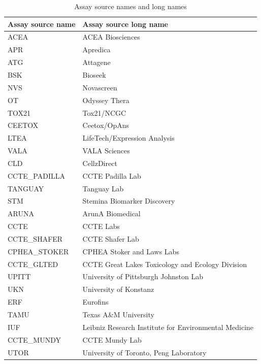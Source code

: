 \begin{table}[h]
    \centering
    \caption{Assay source names and long names}
    \small %
    \begin{tabular}{ll}
        \toprule
        Assay source name & Assay source long name \\
        \midrule
        ACEA & ACEA Biosciences \\
        APR & Apredica \\
        ATG & Attagene \\
        BSK & Bioseek \\
        NVS & Novascreen \\
        OT & Odyssey Thera \\
        TOX21 & Tox21/NCGC \\
        CEETOX & Ceetox/OpAns \\
        LTEA & LifeTech/Expression Analysis \\
        VALA & VALA Sciences \\
        CLD & CellzDirect \\
        CCTE\_PADILLA & CCTE Padilla Lab \\
        TANGUAY & Tanguay Lab \\
        STM & Stemina Biomarker Discovery \\
        ARUNA & ArunA Biomedical \\
        CCTE & CCTE Labs \\
        CCTE\_SHAFER & CCTE Shafer Lab \\
        CPHEA\_STOKER & CPHEA Stoker and Laws Labs \\
        CCTE\_GLTED & CCTE Great Lakes Toxicology and Ecology Division \\
        UPITT & University of Pittsburgh Johnston Lab \\
        UKN & University of Konstanz \\
        ERF & Eurofins \\
        TAMU & Texas A\&M University \\
        IUF & Leibniz Research Institute for Environmental Medicine \\
        CCTE\_MUNDY & CCTE Mundy Lab \\
        UTOR & University of Toronto, Peng Laboratory \\
        \bottomrule
    \end{tabular}
    \label{tab:laboratories}
\end{table}

\clearpage